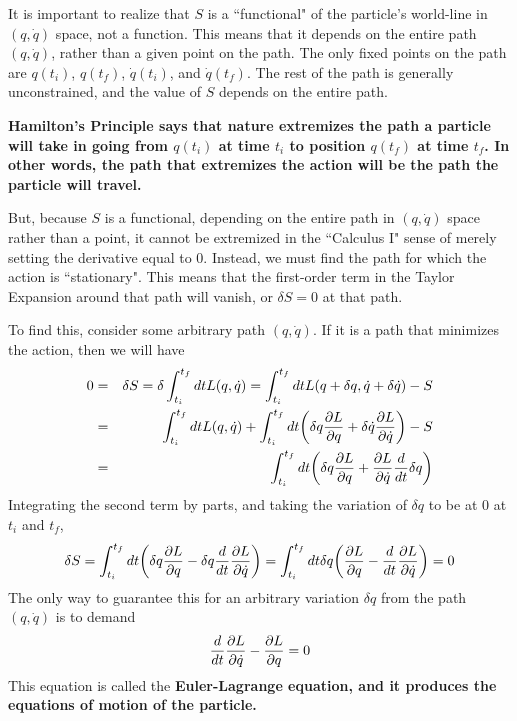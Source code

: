 \documentclass[12pt,epsf]{article}
\def\nolabel{\nonumber }
\def\nolabel{\nonumber }
\begin{document}
It is important to realize that $S$ is a ``functional" of the
particle's world-line in $(q,\dot{q})$ space, not a function. 
This means that it depends on the entire path $(q,\dot{q})$, rather
than a given point on the path.  The only fixed points on the path are
$q(t_i)$, $q(t_f)$, $\dot{q}(t_i)$, and $\dot{q}(t_f)$.	The rest of the
path is generally unconstrained, and the value of $S$ depends on the
entire path.  

\bf Hamilton's Principle \rm says that nature extremizes the path a particle
will take in going from $q(t_i)$ at time $t_i$ to position $q(t_f)$ at
time $t_f$.  In other words, the path that extremizes the action will
be the path the particle will travel.  

But, because $S$ is a functional, depending on the entire path in
$(q,\dot{q})$ space rather than a point, it cannot be extremized in the
``Calculus I" sense of merely setting the derivative equal to 0. 
Instead, we must find the path for which the action is ``stationary". 
This means that the first-order term in the Taylor Expansion around
that path will vanish, or $\delta S = 0$ at that path.	

To find this, consider some arbitrary path $(q,\dot{q})$.  If it is a
path that minimizes the action, then we will have
\begin{eqnarray}
0 &=& \delta S = \delta \int_{t_i}^{t_f} dt L(q,\dot{q}) =
\int_{t_i}^{t_f} dt L(q+\delta q,\dot{q}+\delta \dot{q})-S \nolabel \\
&=& \int_{t_i}^{t_f} dtL(q,\dot{q}) + \int_{t_i}^{t_f} dt\bigg(\delta q
{\partial L \over \partial q} + \delta \dot{q} {\partial L \over
\partial \dot{q}} \bigg) - S \nolabel \\
&=& \int_{t_i}^{t_f} dt \bigg(\delta q {\partial L \over \partial q} +
{\partial L \over \partial \dot{q}} {d \over dt} \delta q\bigg)
\nolabel 
\end{eqnarray}
Integrating the second term by parts, and taking the variation of
$\delta q$ to be at 0 at $t_i$ and $t_f$, 
\begin{eqnarray}
\delta S = \int_{t_i}^{t_f} dt \bigg(\delta q{\partial L \over \partial
q} - \delta q {d \over dt} {\partial L \over \partial \dot{q}} \bigg) =
\int_{t_i}^{t_f} dt \delta q \bigg({\partial L \over \partial q} - {d
\over dt} {\partial L \over \partial \dot{q}} \bigg) = 0 \nolabel 
\end{eqnarray}
The only way to guarantee this for an arbitrary variation $\delta q$
from the path $(q,\dot{q})$ is to demand
\begin{eqnarray}
{d \over dt}{\partial L \over \partial \dot{q}} - {\partial L \over
\partial q} = 0 \nolabel
\end{eqnarray}
This equation is called the \bf Euler-Lagrange \rm equation, and it produces
the equations of motion of the particle.  
\end{document}
